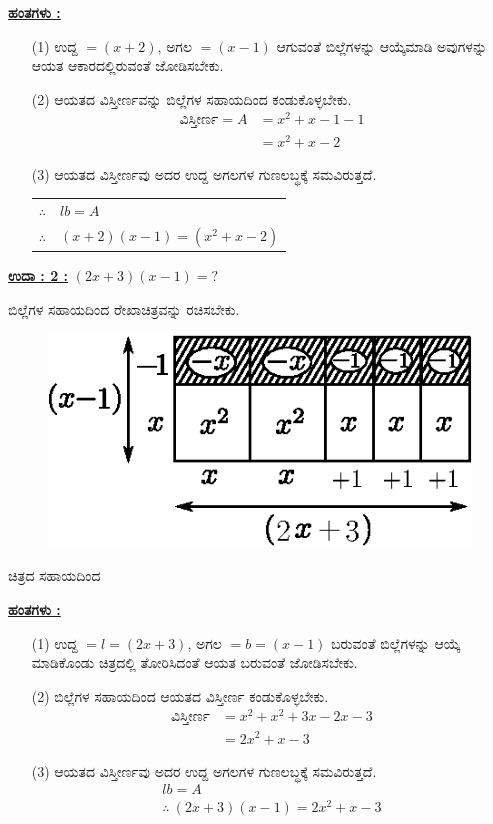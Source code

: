 \noindent
{\textbf{\underline{ಹಂತಗಳು :}}}
\begin{itemize}
\item [(1)] ಉದ್ದ $= (x+2)$, ಅಗಲ $= (x - 1)$ ಆಗುವಂತೆ ಬಿಲ್ಲೆಗಳನ್ನು ಆಯ್ಕೆಮಾಡಿ ಅವುಗಳನ್ನು ಆಯತ ಆಕಾರದಲ್ಲಿರುವಂತೆ ಜೋಡಿಸಬೇಕು.
\item [(2)] ಆಯತದ ವಿಸ್ತೀರ್ಣವನ್ನು ಬಿಲ್ಲೆಗಳ ಸಹಾಯದಿಂದ ಕಂಡುಕೊಳ್ಳಬೇಕು.
\begin{align*}
\text{ವಿಸ್ತೀರ್ಣ} = A & = x^2 + x - 1 - 1\\
& = x^2 + x - 2
\end{align*}

\item [(3)] ಆಯತದ ವಿಸ್ತೀರ್ಣವು ಅದರ ಉದ್ದ ಅಗಲಗಳ ಗುಣಲಬ್ಧಕ್ಕೆ ಸಮವಿರುತ್ತದೆ. 
\begin{tabular}{ll}
$\therefore$ & $lb = A$\\
$\therefore$ & $(x+2)(x-1) = (x^2 + x - 2)$
\end{tabular}

\end{itemize}

\medskip
\noindent
{\textbf{\underline{ಉದಾ : 2 :}}} $(2x + 3) (x - 1) = ?$

ಬಿಲ್ಲೆಗಳ ಸಹಾಯದಿಂದ ರೇಖಾಚಿತ್ರವನ್ನು ರಚಿಸಬೇಕು.
\begin{figure}[H]
\centering
\includegraphics[scale=0.9]{src/figure/chap3/fig3-31b.eps}
\end{figure}
ಚಿತ್ರದ ಸಹಾಯದಿಂದ 

\noindent
{\textbf{\underline{ಹಂತಗಳು :}}}

\begin{itemize}
\item [(1)] ಉದ್ದ $= l = (2x + 3)$, ಅಗಲ $= b = (x - 1)$ ಬರುವಂತೆ ಬಿಲ್ಲೆಗಳನ್ನು ಆಯ್ಕೆ ಮಾಡಿಕೊಂಡು ಚಿತ್ರದಲ್ಲಿ ತೋರಿಸಿದಂತೆ ಆಯತ ಬರುವಂತೆ ಜೋಡಿಸಬೇಕು. 
\item [(2)] ಬಿಲ್ಲೆಗಳ ಸಹಾಯದಿಂದ ಆಯತದ ವಿಸ್ತೀರ್ಣ ಕಂಡುಕೊಳ್ಳಬೇಕು.
\begin{align*}
\text{ವಿಸ್ತೀರ್ಣ} & = x^2 + x^2 + 3x - 2x - 3\\
& = 2x^2 + x - 3
\end{align*}
\item [(3)] ಆಯತದ ವಿಸ್ತೀರ್ಣವು ಅದರ ಉದ್ದ ಅಗಲಗಳ ಗುಣಲಬ್ಧಕ್ಕೆ ಸಮವಿರುತ್ತದೆ.
\begin{gather*}
lb = A\\
\therefore~ (2x + 3)(x - 1) = 2x^2 + x - 3
\end{gather*}
\end{itemize}

